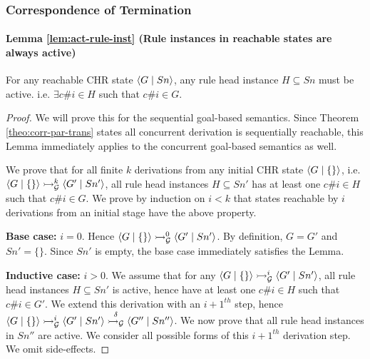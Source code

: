 \documentclass{tlp}
\begin{document}
\subsubsection{Correspondence of Termination}

\paragraph{\bf Lemma \ref{lem:act-rule-inst} (Rule instances in reachable states are always active)}
For any reachable CHR state $\langle G\mid Sn \rangle$, any rule head instance $H \subseteq Sn$ must be active.
i.e. $\exists c\#i \in H$ such that $c\#i \in G$.

\begin{proof}
   We will prove this for the sequential goal-based semantics. Since Theorem \ref{theo:corr-par-trans}
   states all concurrent derivation is sequentially reachable, this Lemma immediately applies to the
   concurrent goal-based semantics as well.
   
   We prove that for all finite $k$ derivations from any initial CHR state $\langle G\mid\{\} \rangle$,
   i.e. $\langle G\mid\{\} \rangle \rightarrowtail_{\cal G}^k \langle G'\mid Sn' \rangle$, all rule head instances $H \subseteq Sn'$
   has at least one $c\#i \in H$ such that $c\#i \in G$. We prove by induction on $i<k$ that states
   reachable by $i$ derivations from an initial stage have the above property.
   
   {\bf Base case:} $i=0$. Hence $\langle G\mid\{\} \rangle \rightarrowtail_{\cal G}^0 \langle G'\mid Sn' \rangle$. By definition,
   $G = G'$ and $Sn' = \{\}$. Since $Sn'$ is empty, the base case immediately satisfies the Lemma.
   
   {\bf Inductive case:} $i>0$. We assume that for any $\langle G\mid\{\} \rangle \rightarrowtail_{\cal G}^i \langle G'\mid Sn' \rangle$,
   all rule head instances $H \subseteq Sn'$ is active, hence have at least one $c\#i \in H$ such that
   $c\#i \in G'$. We extend this derivation with an $i+1^{th}$ step, hence 
   $\langle G\mid\{\} \rangle \rightarrowtail_{\cal G}^i \langle G'\mid Sn' \rangle \stackrel{\delta}{\rightarrowtail_{\cal G}} \langle G''\mid Sn'' \rangle$.
   We now prove that all rule head instances in $Sn''$ are active. We consider all possible
   forms of this $i+1^{th}$ derivation step. We omit side-effects.
   

\end{proof}
\end{document}
